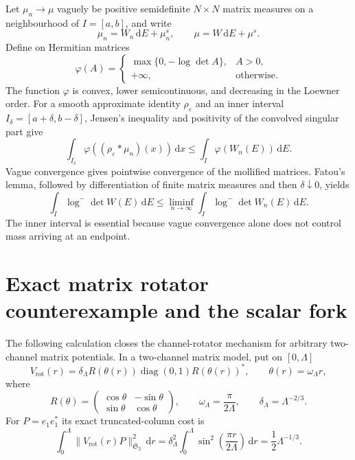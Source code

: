\documentclass[11pt]{article}
\newcommand{\HS}{\mathfrak S_2}
\newcommand{\dd}{\,\mathrm d}
\newcommand{\eps}{\varepsilon}
\DeclareMathOperator{\diag}{diag}
\theoremstyle{definition}
\theoremstyle{remark}
\begin{document}
Let $\mu_n\to\mu$ vaguely be positive semidefinite $N\times N$ matrix measures on a neighbourhood of $I=[a,b]$, and write
\begin{equation}
 \mu_n=W_n\dd E+\mu_n^s,
 \qquad
 \mu=W\dd E+\mu^s.
\end{equation}
Define on Hermitian matrices
\begin{equation}
 \varphi(A)=
 \begin{cases}
 \max\{0,-\log\det A\},&A>0,\\
 +\infty,&\text{otherwise}.
 \end{cases}
\end{equation}
The function $\varphi$ is convex, lower semicontinuous, and decreasing in the Loewner order.  For a smooth approximate identity $\rho_\eps$ and an inner interval $I_\delta=[a+\delta,b-\delta]$, Jensen's inequality and positivity of the convolved singular part give
\begin{equation}
 \int_{I_\delta}\varphi((\rho_\eps*\mu_n)(x))\dd x
 \leq\int_I\varphi(W_n(E))\dd E.
\end{equation}
Vague convergence gives pointwise convergence of the mollified matrices.  Fatou's lemma, followed by differentiation of finite matrix measures and then $\delta\downarrow0$, yields
\begin{equation}
 \int_I\log^-\det W(E)\dd E
 \leq\liminf_{n\to\infty}\int_I\log^-\det W_n(E)\dd E.
 \label{eq:lsc}
\end{equation}
The inner interval is essential because vague convergence alone does not control mass arriving at an endpoint.

\section{Exact matrix rotator counterexample and the scalar fork}
\label{app:rotator}

The following calculation closes the channel-rotator mechanism for arbitrary
two-channel matrix potentials.  In a two-channel matrix model, put on
$[0,\Lambda]$
\begin{equation}
 V_{\mathrm{rot}}(r)=\delta_\Lambda
 R(\theta(r))\diag(0,1)R(\theta(r))^*,
 \qquad
 \theta(r)=\omega_\Lambda r,
 \label{eq:exact-rotator-potential}
\end{equation}
where
\begin{equation}
 R(\theta)=\begin{pmatrix}\cos\theta&-\sin\theta\\
                    \sin\theta& \cos\theta\end{pmatrix},
 \qquad
 \omega_\Lambda=\frac{\pi}{2\Lambda},
 \qquad
 \delta_\Lambda=\Lambda^{-2/3}.
\end{equation}
For $P=e_1e_1^*$ its exact truncated-column cost is
\begin{equation}
 \int_0^\Lambda\|V_{\mathrm{rot}}(r)P\|_{\HS}^2\dd r
 =\delta_\Lambda^2\int_0^\Lambda
   \sin^2\!\left(\frac{\pi r}{2\Lambda}\right)\dd r
 =\frac12\Lambda^{-1/3}.
 \label{eq:exact-rotator-cost}
\end{equation}
\end{document}
